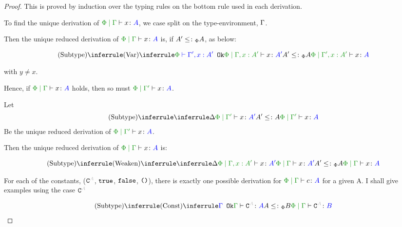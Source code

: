 \documentclass{report}
\begin{document}
 
 \begin{framed}
        \begin{proof}
            This is proved by induction over the typing rules on the bottom rule used in each derivation.

            To find the unique derivation of $\gpetyperelation{x}{A}$, we case split on the type-environment, $\Gamma$.
            
            Then the unique reduced derivation of $\gpetyperelation{x}{A}$ is, if $A' \leq\colon_\Phi A$, as below:
            
            \begin{equation}
                \ntreeruleII{Subtype}{\ntreeruleI{Var}{\wellformedok{\P}{\G', x: A'}}{\etyperelation{\P}{\G,x: A'}{x}{A'}}}{ A' \subtypep A}{\etyperelation{\P}{\G', x: A'}{x}{A}}
            \end{equation}
            
             with $y \neq x$.
            
            Hence, if $\gpetyperelation{x}{A}$ holds, then so must $\etyperelation{\P}{\G'}{x}{A}$.
            
            Let 
            \begin{equation}
                \edeltavrule{\P}{\G'}{x}{A'}{A}
            \end{equation}
            Be the  unique reduced derivation of $\etyperelation{\P}{\G'}{x}{A}$.
            
            Then the unique reduced derivation of $\gpetyperelation{x}{A}$ is:
            
            
            \begin{equation}
                \ntreeruleII{Subtype}{
                    \ntreeruleI{Weaken}{
                        \treeruleI{\D}{\etyperelation{\P}{\G, x: A'}{x}{A'}}
                    }{\gpetyperelation{x}{A'}}   
                }{ A' \subtypep A
                }{\gpetyperelation{x}{A}}
            \end{equation}
            
            For each of the constants, ($\const{A}$, $\texttt{true}$, $\texttt{false}$, $\texttt{()}$), there is exactly one possible derivation for $\etyperelation{\P}{\G}{c}{A}$ for a given A. I shall give examples using the case $\const{A}$
            
            
            $$
                \ntreeruleII{Subtype}{\truleconst}{ A \subtypep B}{\gpetyperelation{\const{A}}{B}}
            $$
            

\end{proof}
\end{framed}
\end{document}
